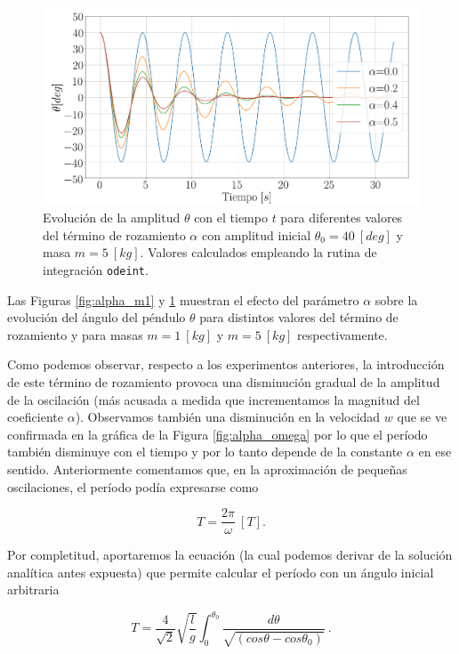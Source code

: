 \documentclass[journal]{IEEEtran}
\begin{document}
\begin{figure}[!htb]
  \centering
  \includegraphics[width=\linewidth]{alpha_m5}
  \caption{Evolución de la amplitud $\theta$ con el tiempo $t$ para diferentes valores del término de rozamiento $\alpha$ con amplitud inicial $\theta_0=40~[deg]$ y masa $m=5~[kg]$. Valores calculados empleando la rutina de integración \texttt{odeint}.}
  \label{fig:alpha_m2}
\end{figure}

Las Figuras \ref{fig:alpha_m1} y \ref{fig:alpha_m2} muestran el efecto del parámetro $\alpha$ sobre la evolución del ángulo del péndulo $\theta$ para distintos valores del término de rozamiento y para masas $m=1~[kg]$ y $m=5~[kg]$ respectivamente.

Como podemos observar, respecto a los experimentos anteriores, la introducción de este término de rozamiento provoca una disminución gradual de la amplitud de la oscilación (más acusada a medida que incrementamos la magnitud del coeficiente $\alpha$). Observamos también una disminución en la velocidad $w$ que se ve confirmada en la gráfica de la Figura \ref{fig:alpha_omega} por lo que el período también disminuye con el tiempo y por lo tanto depende de la constante $\alpha$ en
ese sentido. Anteriormente comentamos que, en la aproximación de pequeñas oscilaciones, el período podía expresarse como

\begin{equation}
  T = \displaystyle\frac{2\pi}{\omega} ~[T].
\end{equation}

Por completitud, aportaremos la ecuación (la cual podemos derivar de la solución analítica antes expuesta) que permite calcular el período con un ángulo inicial arbitraria

\begin{equation}
  T = \displaystyle\frac{4}{\sqrt{2}}\sqrt{\displaystyle\frac{l}{g}}\int_0^{\theta_0} \displaystyle\frac{d\theta}{\sqrt{(cos\theta - cos\theta_0)}}~.
\end{equation}
\end{document}
